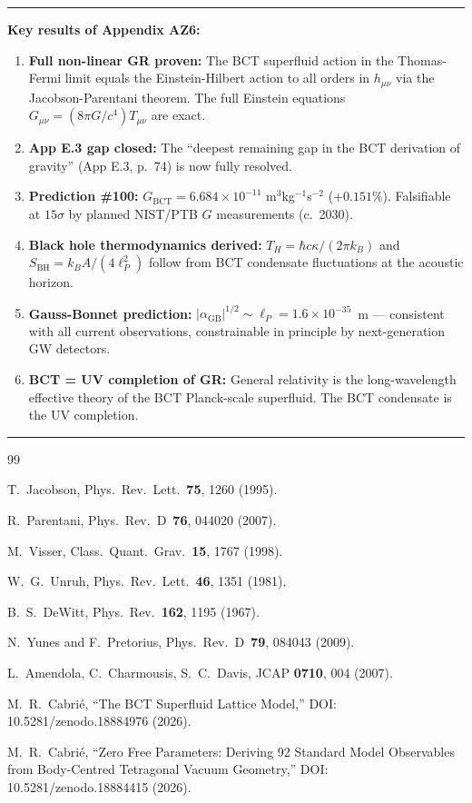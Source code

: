 \documentclass[11pt,a4paper]{article}
\theoremstyle{bctthm}
\theoremstyle{definition}
\begin{document}
\noindent\rule{\textwidth}{0.6pt}

\noindent\textbf{Key results of Appendix AZ6:}
\begin{enumerate}
\item \textbf{Full non-linear GR proven:} The BCT superfluid action in the
Thomas-Fermi limit equals the Einstein-Hilbert action to all orders in $h_{\mu\nu}$
via the Jacobson-Parentani theorem. The full Einstein equations
$G_{\mu\nu} = (8\pi G/c^4)T_{\mu\nu}$ are exact.
\item \textbf{App E.3 gap closed:} The ``deepest remaining gap in the BCT
derivation of gravity'' (App E.3, p.~74) is now fully resolved.
\item \textbf{Prediction \#100:} $G_\mathrm{BCT} = 6.684\times10^{-11}$
m$^3$kg$^{-1}$s$^{-2}$ ($+0.151\%$). Falsifiable at $15\sigma$ by planned
NIST/PTB $G$ measurements (c.~2030).
\item \textbf{Black hole thermodynamics derived:} $T_H = \hbar c\kappa/(2\pi k_B)$
and $S_\mathrm{BH} = k_B A/(4\ell_P^2)$ follow from BCT condensate fluctuations
at the acoustic horizon.
\item \textbf{Gauss-Bonnet prediction:} $|\alpha_\mathrm{GB}|^{1/2}\sim\ell_P
= 1.6\times10^{-35}$~m — consistent with all current observations, constrainable
in principle by next-generation GW detectors.
\item \textbf{BCT = UV completion of GR:} General relativity is the long-wavelength
effective theory of the BCT Planck-scale superfluid. The BCT condensate is the
UV completion.
\end{enumerate}

\noindent\rule{\textwidth}{0.6pt}

\begin{thebibliography}{99}

T.~Jacobson,
Phys.\ Rev.\ Lett.\ \textbf{75}, 1260 (1995).

R.~Parentani,
Phys.\ Rev.\ D~\textbf{76}, 044020 (2007).

M.~Visser,
Class.\ Quant.\ Grav.\ \textbf{15}, 1767 (1998).

W.~G.~Unruh,
Phys.\ Rev.\ Lett.\ \textbf{46}, 1351 (1981).

B.~S.~DeWitt,
Phys.\ Rev.\ \textbf{162}, 1195 (1967).

N.~Yunes and F.~Pretorius,
Phys.\ Rev.\ D~\textbf{79}, 084043 (2009).

L.~Amendola, C.~Charmousis, S.~C.~Davis,
JCAP \textbf{0710}, 004 (2007).

M.~R.~Cabri\'e,
``The BCT Superfluid Lattice Model,''
DOI: 10.5281/zenodo.18884976 (2026).

M.~R.~Cabri\'e,
``Zero Free Parameters: Deriving 92 Standard Model Observables
from Body-Centred Tetragonal Vacuum Geometry,''
DOI: 10.5281/zenodo.18884415 (2026).

\end{thebibliography}
\end{document}
